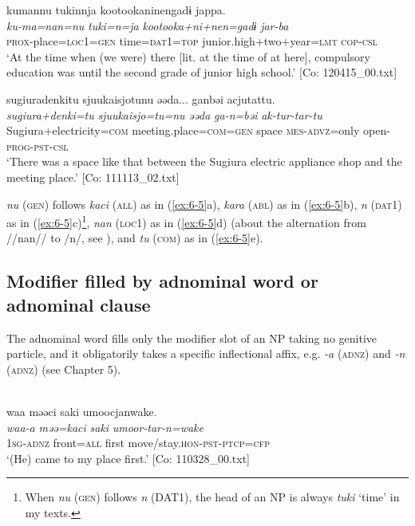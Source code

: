 \ex
{\TM}
\glll kumannu  tukinnja  {\textbar}kootookaninen{\textbar}gadɨ jappa.\\
\textit{ku-ma=nan=nu}  \textit{tuki=n=ja}  \textit{kootooka+ni+nen=gadɨ}   \textit{jar-ba}\\
\textsc{prox}-place=\textsc{loc1}=\textsc{gen}  time=\textsc{dat}1=\textsc{top}  junior.high+two+year=\textsc{lmt}   \textsc{cop}-\textsc{csl}\\
\glt ‘At the time when (we were) there [lit. at the time of at here], compulsory education was until the second grade of junior high school.’ [Co: 120415\_00.txt]
\z

\ex
{\TM}
\glll {\textbar}sugiuradenki{\textbar}tu  {\textbar}sjuukaisjo{\textbar}tunu  əəda...  ganbəi  acjutattu.\\
\textit{sugiura+denki=tu}  \textit{sjuukaisjo=tu=nu}  \textit{əəda}  \textit{ga-n=bəi}  \textit{ak-tur-tar-tu}\\
Sugiura+electricity=\textsc{com}  meeting.place=\textsc{com}=\textsc{gen}  space  \textsc{mes}-\textsc{advz}=only   open-\textsc{prog}-\textsc{pst}-\textsc{csl}\\
\glt ‘There was a space like that between the Sugiura electric appliance shop and the meeting place.’ [Co: 111113\_02.txt]
\z
\z

\textit{nu} (\textsc{gen}) follows \textit{kaci} (\textsc{all}) as in (\ref{ex:6-5}a), \textit{kara} (\textsc{abl}) as in (\ref{ex:6-5}b), \textit{n} (\textsc{dat}1) as in (\ref{ex:6-5}c)\footnote{When \textit{nu} (\textsc{gen}) follows \textit{n} (DAT1), the head of an NP is always \textit{tuki} ‘time’ in my texts.}, \textit{nan} (\textsc{loc1}) as in (\ref{ex:6-5}d) (about the alternation from //nan// to /n/, see ), and \textit{tu} (\textsc{com}) as in (\ref{ex:6-5}e).

\subsection{Modifier filled by adnominal word or adnominal clause}

The adnominal word fills only the modifier slot of an NP taking no genitive particle, and it obligatorily takes a specific inflectional affix, e.g. \textit{-a} (\textsc{adnz}) and \textit{-n} (\textsc{adnz}) (see Chapter 5).

\ea\label{ex:6-6}
\ea{}\\
{\US}
\glll  waa  məəci  saki  umoocjanwake.\\
\textit{waa-a}  \textit{məə=kaci}  \textit{saki}  \textit{umoor-tar-n=wake}\\
1\textsc{sg}-\textsc{adnz}  front=\textsc{all}  first  move/stay.\textsc{hon}-\textsc{pst}-\textsc{ptcp}=\textsc{cfp}\\
\glt ‘(He) came to my place first.’ [Co: 110328\_00.txt]
\z

